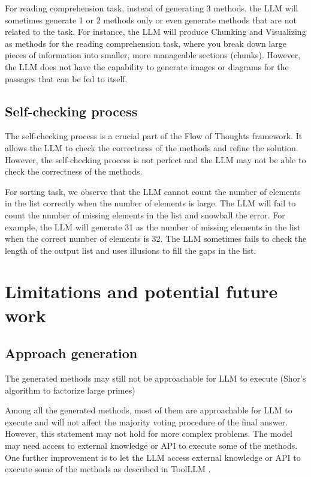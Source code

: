 \documentclass{article}
\begin{document}
For reading comprehension task, instead of generating 3 methods, the LLM will sometimes generate 1 or 2 methods only or even generate methods that are not related to the task. For instance, the LLM will produce Chunking and Visualizing as methods for the reading comprehension task, where you break down large pieces of information into smaller, more manageable sections (chunks). However, the LLM does not have the capability to generate images or diagrams for the passages that can be fed to itself.

\subsection{Self-checking process}

The self-checking process is a crucial part of the Flow of Thoughts framework. It allows the LLM to check the correctness of the methods and refine the solution. However, the self-checking process is not perfect and the LLM may not be able to check the correctness of the methods.

For sorting task, we observe that the LLM cannot count the number of elements in the list correctly when the number of elements is large. The LLM will fail to count the number of missing elements in the list and snowball the error. For example, the LLM will generate 31 as the number of missing elements in the list when the correct number of elements is 32. The LLM sometimes fails to check the length of the output list and uses illusions to fill the gaps in the list.

\section{Limitations and potential future work}

\subsection{Approach generation}
The generated methods may still not be approachable for LLM to execute (Shor's algorithm to factorize large primes)

Among all the generated methods, most of them are approachable for LLM to execute and will not affect the majority voting procedure of the final answer. However, this statement may not hold for more complex problems. The model may need access to external knowledge or API to execute some of the methods. One further improvement is to let the LLM access external knowledge or API to execute some of the methods as described in ToolLLM \cite{qin2023toolllmfacilitatinglargelanguage}.
\end{document}
